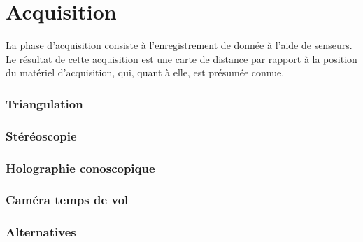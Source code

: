 \chapter{Acquisition \label{acquisition}}
La phase d'acquisition consiste à l'enregistrement de donnée à l'aide de senseurs. Le résultat de cette acquisition est une carte de distance par rapport à la position du matériel d'acquisition, qui, quant à elle, est présumée connue.
\subsection{Triangulation}



\subsection{Stéréoscopie}

\subsection{Holographie conoscopique}

\subsection{Caméra temps de vol}

\subsection{Alternatives}
